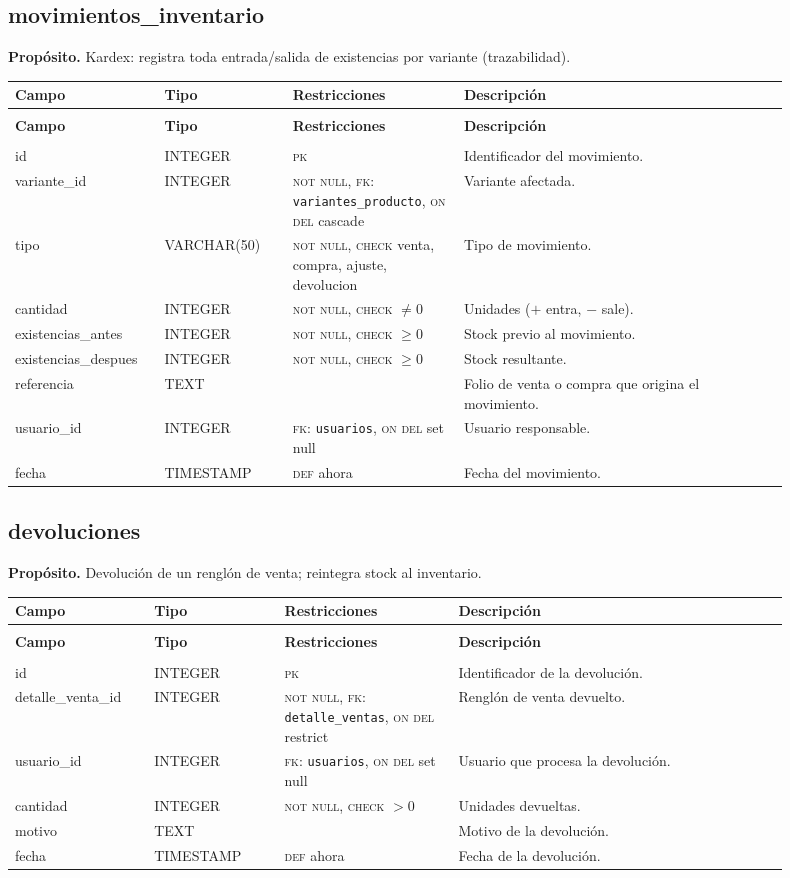 \documentclass[11pt]{article}
\makeatletter
\newenvironment{campos}{%
  \par\footnotesize
  \setlength{\LTpre}{0.3ex}\setlength{\LTpost}{0.6ex}
  \begin{longtable}{@{}>{\ttfamily}p{0.165\linewidth} >{\ttfamily}p{0.150\linewidth} p{0.205\linewidth} >{\raggedright\arraybackslash}p{0.385\linewidth}@{}}
  \toprule
  \normalfont\bfseries Campo & \normalfont\bfseries Tipo & \normalfont\bfseries Restricciones & \normalfont\bfseries Descripción \\
  \midrule \endfirsthead
  \multicolumn{4}{@{}l}{\footnotesize\itshape \dots\ continuación}\\[0.3ex]
  \toprule
  \normalfont\bfseries Campo & \normalfont\bfseries Tipo & \normalfont\bfseries Restricciones & \normalfont\bfseries Descripción \\
  \midrule \endhead
  \midrule \multicolumn{4}{r@{}}{\footnotesize\itshape continúa en la siguiente página}\\ \endfoot
  \bottomrule \endlastfoot
}{%
  \end{longtable}\par
}
\newcommand{\proposito}[1]{\par\vspace{0.2ex}\noindent\colorbox{brandlight}{\parbox{\dimexpr\linewidth-2\fboxsep}{\small\textbf{Propósito.} #1}}\par\vspace{0.8ex}}
\newcommand{\pk}{\textsc{pk}}
\newcommand{\fk}[1]{\textsc{fk}: \texttt{#1}}
\newcommand{\nn}{\textsc{not null}}
\makeatother
\begin{document}
\subsection{movimientos\_inventario}
\proposito{Kardex: registra toda entrada/salida de existencias por variante (trazabilidad).}
\begin{campos}
id                  & INTEGER     & \pk{}   & Identificador del movimiento. \\
variante\_id        & INTEGER     & \nn, \fk{variantes\_producto}, \textsc{on del} cascade & Variante afectada. \\
tipo                & VARCHAR(50) & \nn, \textsc{check} venta, compra, ajuste, devolucion & Tipo de movimiento. \\
cantidad            & INTEGER     & \nn, \textsc{check} $\neq 0$ & Unidades ($+$ entra, $-$ sale). \\
existencias\_antes  & INTEGER     & \nn, \textsc{check} $\geq 0$ & Stock previo al movimiento. \\
existencias\_despues & INTEGER    & \nn, \textsc{check} $\geq 0$ & Stock resultante. \\
referencia          & TEXT        &         & Folio de venta o compra que origina el movimiento. \\
usuario\_id         & INTEGER     & \fk{usuarios}, \textsc{on del} set null & Usuario responsable. \\
fecha               & TIMESTAMP   & \textsc{def} ahora & Fecha del movimiento. \\
\end{campos}

\subsection{devoluciones}
\proposito{Devolución de un renglón de venta; reintegra stock al inventario.}
\begin{campos}
id                & INTEGER   & \pk{}   & Identificador de la devolución. \\
detalle\_venta\_id & INTEGER  & \nn, \fk{detalle\_ventas}, \textsc{on del} restrict & Renglón de venta devuelto. \\
usuario\_id       & INTEGER   & \fk{usuarios}, \textsc{on del} set null & Usuario que procesa la devolución. \\
cantidad          & INTEGER   & \nn, \textsc{check} $>0$ & Unidades devueltas. \\
motivo            & TEXT      &         & Motivo de la devolución. \\
fecha             & TIMESTAMP & \textsc{def} ahora & Fecha de la devolución. \\
\end{campos}
\end{document}
